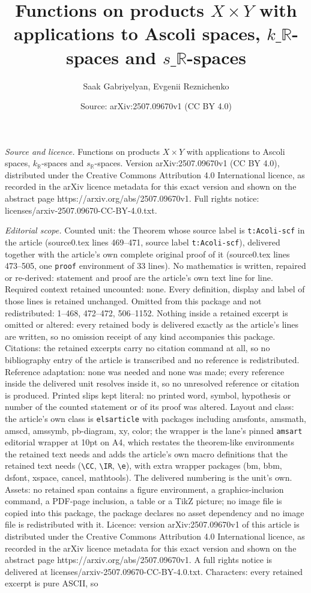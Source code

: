\documentclass[10pt,a4paper]{amsart}
\title[Functions on products $X \times Y$ with applications to Asco]{Functions on products $X \times Y$ with applications to Ascoli spaces, $k\_{\mathbb{R}}$-spaces and $s\_{\mathbb{R}}$-spaces}
\author{Saak Gabriyelyan, Evgenii Reznichenko}
\date{Source: arXiv:2507.09670v1 (CC BY 4.0)}
\begin{document}
\maketitle

\noindent\emph{Source and licence.} Functions on products $X \times Y$ with applications to Ascoli spaces, $k_{\mathbb{R}}$-spaces and $s_{\mathbb{R}}$-spaces. Version arXiv:2507.09670v1 (CC BY 4.0), distributed under the Creative Commons Attribution 4.0 International licence, as recorded in the arXiv licence metadata for this exact version and shown on the abstract page https://arxiv.org/abs/2507.09670v1. Full rights notice: licenses/arxiv-2507.09670-CC-BY-4.0.txt.\par\smallskip

\noindent\textit{Editorial scope.} Counted unit: the Theorem whose source label is \texttt{t:Acoli-scf} in the article (source0.tex lines 469--471, source label \texttt{t:Acoli-scf}), delivered together with the article's own complete original proof of it (source0.tex lines 473--505, one \texttt{proof} environment of 33 lines). No mathematics is written, repaired or re-derived: statement and proof are the article's own text line for line. Required context retained uncounted: none. Every definition, display and label of those lines is retained unchanged. Omitted from this package and not redistributed: 1--468, 472--472, 506--1152. Nothing inside a retained excerpt is omitted or altered: every retained body is delivered exactly as the article's lines are written, so no omission receipt of any kind accompanies this package. Citations: the retained excerpts carry no citation command at all, so no bibliography entry of the article is transcribed and no reference is redistributed. Reference adaptation: none was needed and none was made; every reference inside the delivered unit resolves inside it, so no unresolved reference or citation is produced. Printed slips kept literal: no printed word, symbol, hypothesis or number of the counted statement or of its proof was altered. Layout and class: the article's own class is \texttt{elsarticle} with packages including amsfonts, amsmath, amscd, amssymb, pb-diagram, xy, color; the wrapper is the lane's pinned \texttt{amsart} editorial wrapper at 10pt on A4, which restates the theorem-like environments the retained text needs and adds the article's own macro definitions that the retained text needs (\texttt{\textbackslash CC}, \texttt{\textbackslash IR}, \texttt{\textbackslash e}), with extra wrapper packages (bm, bbm, dsfont, xspace, cancel, mathtools). The delivered numbering is the unit's own. Assets: no retained span contains a figure environment, a graphics-inclusion command, a PDF-page inclusion, a table or a TikZ picture; no image file is copied into this package, the package declares no asset dependency and no image file is redistributed with it. Licence: version arXiv:2507.09670v1 of this article is distributed under the Creative Commons Attribution 4.0 International licence, as recorded in the arXiv licence metadata for this exact version and shown on the abstract page https://arxiv.org/abs/2507.09670v1. A full rights notice is delivered at licenses/arxiv-2507.09670-CC-BY-4.0.txt. Characters: every retained excerpt is pure ASCII, so 
\end{document}
